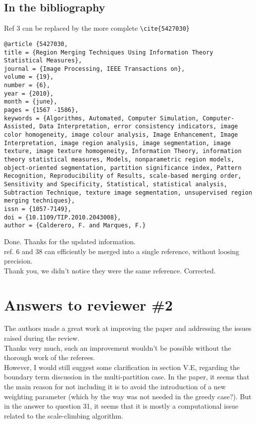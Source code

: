 \documentclass[a4paper,10pt]{report}
\begin{document}
\section{ In the bibliography }
\que Ref 3 can be replaced by the more complete \verb+\cite{5427030}+
\begin{verbatim}
@article {5427030, 
title = {Region Merging Techniques Using Information Theory Statistical Measures}, 
journal = {Image Processing, IEEE Transactions on}, 
volume = {19}, 
number = {6}, 
year = {2010}, 
month = {june}, 
pages = {1567 -1586}, 
keywords = {Algorithms, Automated, Computer Simulation, Computer-Assisted, Data Interpretation, error consistency indicators, image color homogeneity, image colour analysis, Image Enhancement, Image Interpretation, image region analysis, image segmentation, image texture, image texture homogeneity, Information Theory, information theory statistical measures, Models, nonparametric region models, object-oriented segmentation, partition significance index, Pattern Recognition, Reproducibility of Results, scale-based merging order, Sensitivity and Specificity, Statistical, statistical analysis, Subtraction Technique, texture image segmentation, unsupervised region merging techniques}, 
issn = {1057-7149}, 
doi = {10.1109/TIP.2010.2043008}, 
author = {Calderero, F. and Marques, F.} 
\end{verbatim}

\ans Done. Thanks for the updated information.\\

\que ref. 6 and 38 can efficiently be merged into a single reference, without loosing precision. \\

\ans Thank you, we didn't notice they were the same reference. Corrected.\\

\chapter{Answers to reviewer \#2}

\que The authors made a great work at improving the paper and addressing the issues raised during the review. \\
\ans Thanks very much, such an improvement wouldn't be possible without the thorough work of the referees.\\

\que However, I would still suggest some clarification in section V.E, regarding the boundary term discussion in the multi-partition case. In the paper, it seems that the main reason for not including it is to avoid the introduction of a new weighting parameter (which by the way was not needed in the greedy case?). But in the answer to question 31, it seems that it is mostly a computational issue related to the scale-climbing algorithm. \\
\end{document}
